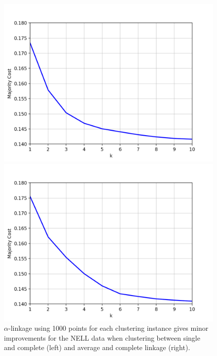 \begin{figure}[h]
\centering
\begin{minipage}{.45\textwidth}
  \centering
  \includegraphics[width=\linewidth]{plots/nell_sc_1000_top10}
\end{minipage}
\begin{minipage}{.45\textwidth}
  \centering
  \includegraphics[width=\linewidth]{plots/nell_ac_1000_top10}
\end{minipage}
\caption{$\alpha$-linkage using 1000 points for each clustering instance gives minor improvements for the NELL data when clustering between single and complete (left) and average and complete linkage (right).}
\label{fig:nell1000top10}
\end{figure}

